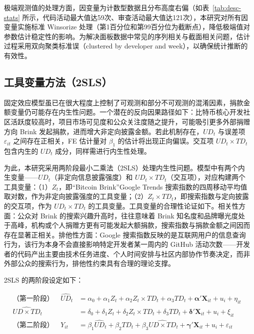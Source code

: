 极端观测值的处理方面，因变量为计数型数据且分布高度右偏（如表~\ref{tab:desc-stats} 所示，代码活动最大值达59次、审查活动最大值达121次），本研究对所有因变量实施标准 Winsorize 处理（第1百分位和第99百分位为截断点），降低极端值对参数估计稳定性的影响。为解决面板数据中常见的序列相关与截面相关问题，估计过程采用双向聚类标准误（clustered by developer and week），以确保统计推断的有效性。

\subsection{工具变量方法（2SLS）}
\label{sec:iv-method}

固定效应模型虽已在很大程度上控制了可观测和部分不可观测的混淆因素，捐款金额变量仍可能存在内生性问题。一个潜在的反向因果路径如下：比特币核心开发社区活跃度较高时，项目市场可见度和公众关注度随之提升，可能吸引更多外部捐赠方向 Brink 发起捐款，进而增大非定向披露金额。若此机制存在，$UD_t$ 与误差项 $\varepsilon_{it}$ 之间存在正相关，FE 估计量对 $\beta_1$ 的估计将出现正向偏误。交互项 $UD_t \times TD_t$ 包含内生的 $UD_t$ 成分，同样需进行内生性处理。

为此，本研究采用两阶段最小二乘法（2SLS）处理内生性问题。模型中有两个内生变量——$UD_t$（非定向信息披露强度）和 $UD_t \times TD_t$（交互项），对应构建两个工具变量：（1）$Z_t$，即“Bitcoin Brink”Google Trends 搜索指数的四周移动平均值取对数，作为非定向披露强度的工具变量；（2）$Z_t \times TD_t$，即搜索指数与定向披露的交互项，作为 $UD_t \times TD_t$ 的工具变量。工具变量的合理性论证如下。相关性方面：公众对 Brink 的搜索兴趣升高时，往往意味着 Brink 知名度和品牌曝光度处于高峰，机构或个人捐赠方更有可能发起大额捐款，搜索指数与捐款金额之间因而存在显著正相关。排他性方面：Google 搜索指数反映的是互联网用户的信息查询行为，该行为本身不会直接影响特定开发者某一周内的 GitHub 活动次数——开发者的代码产出主要由技术任务进度、个人时间安排与社区内部协作节奏决定，而非外部公众的搜索行为，排他性约束具有合理的理论支撑。

2SLS 的两阶段设定如下：

\begin{align}
\text{（第一阶段）}\quad
    \widehat{UD}_t
        &= \alpha_0 + \alpha_1 Z_t
           + \alpha_2 Z_t \times TD_t
           + \alpha_3 TD_t
           + \boldsymbol{\alpha}' \mathbf{X}_{it} + u_i + \eta_{it}
\label{eq:first-stage} \\[0.5em]
    \widehat{UD \times TD}_t
        &= \delta_0 + \delta_1 Z_t
           + \delta_2 Z_t \times TD_t
           + \delta_3 TD_t
           + \boldsymbol{\delta}' \mathbf{X}_{it} + u_i + \xi_{it}
\label{eq:first-stage-2} \\[0.5em]
\text{（第二阶段）}\quad
    Y_{it}
        &= \beta_1 \widehat{UD}_t
           + \beta_2 TD_t
           + \beta_3 \widehat{UD \times TD}_t
           + \boldsymbol{\gamma}' \mathbf{X}_{it}
           + u_i + \varepsilon_{it}
\label{eq:second-stage}
\end{align}

